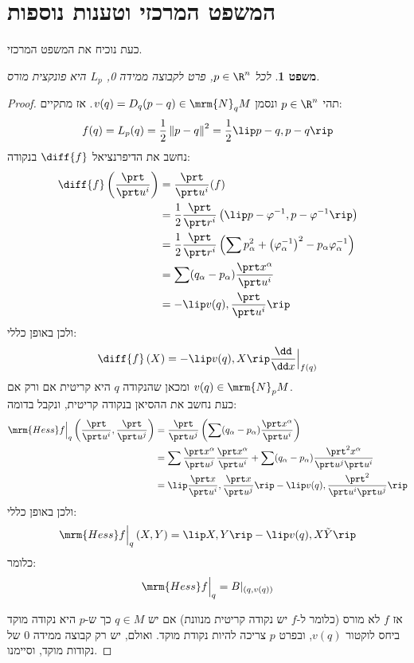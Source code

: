 \documentclass{article}
\newtheorem*{theorem*}{משפט}
\theoremstyle{definition}
\newcommand{\norm}[1]{\left\lVert#1\right\rVert}
\begin{document}
	\section{המשפט המרכזי וטענות נוספות}
	כעת נוכיח את המשפט המרכזי.
	\begin{theorem*}
		לכל
		\(p\in \R^n\),
		פרט לקבוצה ממידה 0, \(L_p\) היא פונקצית מורס.
	\end{theorem*}
	\begin{proof}
		תהי
		\(p\in\R^n\)
		ונסמן
		\(v(q) = D_q(p-q) \in \mrm{N}_q M\).
		אז מתקיים:
		\[
			f(q)
			=L_p(q)
			=\frac{1}{2}\norm{p-q}^2
			=\frac{1}{2}\lip p-q,p-q \rip
		\]
		נחשב את הדיפרנציאל
		\(\diff{f}\)
		בנקודה:
		\begin{equation*}\begin{split}
			\diff{f}\left(\frac{\prt}{\prt u^i}\right)
			&=\frac{\prt}{\prt u^i}(f)
			\\&=\frac{1}{2}\frac{\prt}{\prt r^i}\left(\lip p-\varphi^{-1},p-\varphi^{-1} \rip\right)
			\\&=\frac{1}{2}\frac{\prt}{\prt r^i}\left(\sum p_\alpha^2+\left(\varphi_\alpha^{-1}\right)^2-p_\alpha\varphi_\alpha^{-1}\right)
			\\&=\sum (q_\alpha-p_\alpha)\frac{\prt x^\alpha}{\prt u^i}
			\\&=-\lip v(q),\frac{\prt}{\prt u^i} \rip
		\end{split}\end{equation*}
		ולכן באופן כללי:
		\[
			\diff{f}\left(X\right)
			=-\lip v(q),X \rip \frac{\dd}{\dd x}\Big|_{f(q)}
		\]
		ומכאן שהנקודה \(q\) היא קריטית אם ורק אם
		\(v(q)\in \mrm{N}_p M\).
		\\
		כעת נחשב את ההסיאן בנקודה קריטית, ונקבל בדומה:
		\begin{equation*}\begin{split}
			\mrm{Hess} f\Big|_q\left(\frac{\prt}{\prt u^i},\frac{\prt}{\prt u^j}\right)
			&=\frac{\prt}{\prt u^j}\left(\sum (q_\alpha-p_\alpha)\frac{\prt x^\alpha}{\prt u^i}\right)
			\\&=\sum \frac{\prt x^\alpha}{\prt u^j}\frac{\prt x^\alpha}{\prt u^i}
			+ \sum (q_\alpha-p_\alpha)\frac{\prt^2 x^\alpha}{\prt u^j\prt u^i}
			\\&=\lip \frac{\prt x}{\prt u^i},\frac{\prt x}{\prt u^j} \rip
			- \lip v(q),\frac{\prt^2}{\prt u^i\prt u^j} \rip
		\end{split}\end{equation*}
		ולכן באופן כללי:
		\[
			\mrm{Hess} f\Big|_q\left(X,Y\right)
			=\lip X,Y \rip - \lip v(q),X\tilde{Y} \rip
		\]
		כלומר:
		\[
			\mrm{Hess} f\Big|_q=B|_{(q,v(q))}
		\]
		
		אז \(f\) לא מורס (כלומר ל-\(f\) יש נקודה קריטית מנוונת) אם יש
		\(q \in M\)
		כך ש-\(p\) היא נקודה מוקד ביחס לוקטור
		\(v(q)\),
		ובפרט \(p\) צריכה להיות נקודת מוקד.
		ואולם, יש רק קבוצה ממידה \(0\) של נקודות מוקד, וסיימנו.
	\end{proof}
\end{document}
